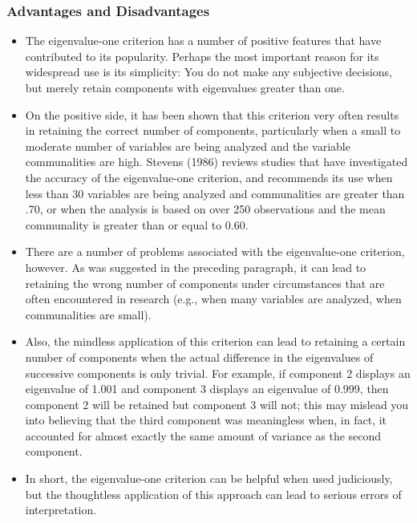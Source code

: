 \documentclass[a4paper,12pt]{article}
\begin{document}
\subsubsection{Advantages and Disadvantages}
\begin{itemize}
	\item The eigenvalue-one criterion has a number of positive features that have contributed to its
	popularity.  Perhaps the most important reason for its widespread use is its simplicity:  You do
	not make any subjective decisions, but merely retain components with eigenvalues greater than
	one.
	
	\item 	On the positive side, it has been shown that this criterion very often results in retaining the
	correct number of components, particularly when a small to moderate number of variables are
	being analyzed and the variable communalities are high.  Stevens (1986) reviews studies that
	have investigated the accuracy of the eigenvalue-one criterion, and recommends its use when
	less than 30 variables are being analyzed and communalities are greater than .70, or when the
	analysis is based on over 250 observations and the mean communality is greater than or equal to
	0.60.
	
	\item 	There are a number of problems associated with the eigenvalue-one criterion, however.  As was
	suggested in the preceding paragraph, it can lead to retaining the wrong number of components
	under circumstances that are often encountered in research (e.g., when many variables are
	analyzed, when communalities are small).
	
	\item 	Also, the mindless application of this criterion can
	lead to retaining a certain number of components when the actual difference in the eigenvalues
	of successive components is only trivial.  For example, if component 2 displays an eigenvalue of
	1.001 and component 3 displays an eigenvalue of 0.999, then component 2 will be retained but
	component 3 will not; this may mislead you into believing that the third component was
	meaningless when, in fact, it accounted for almost exactly the same amount of variance as the
	second component.
	
	\item 	In short, the eigenvalue-one criterion can be helpful when used judiciously,
	but the thoughtless application of this approach can lead to serious errors of interpretation.
\end{itemize}
\end{document}
